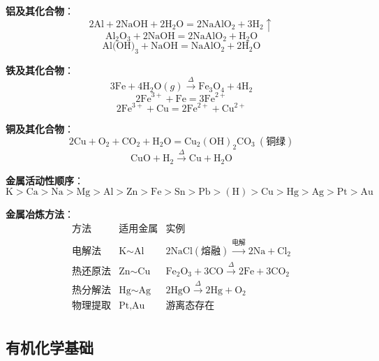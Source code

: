 \textbf{铝及其化合物}：
\[
2\text{Al} + 2\text{NaOH} + 2\text{H}_2\text{O} = 2\text{NaAlO}_2 + 3\text{H}_2\uparrow
\]
\[
\text{Al}_2\text{O}_3 + 2\text{NaOH} = 2\text{NaAlO}_2 + \text{H}_2\text{O}
\]
\[
\text{Al(OH)}_3 + \text{NaOH} = \text{NaAlO}_2 + 2\text{H}_2\text{O}
\]

\textbf{铁及其化合物}：
\[
3\text{Fe} + 4\text{H}_2\text{O}(g) \xrightarrow{\Delta} \text{Fe}_3\text{O}_4 + 4\text{H}_2
\]
\[
2\text{Fe}^{3+} + \text{Fe} = 3\text{Fe}^{2+}
\]
\[
2\text{Fe}^{3+} + \text{Cu} = 2\text{Fe}^{2+} + \text{Cu}^{2+}
\]

\textbf{铜及其化合物}：
\[
2\text{Cu} + \text{O}_2 + \text{CO}_2 + \text{H}_2\text{O} = \text{Cu}_2(\text{OH})_2\text{CO}_3\ (\text{铜绿})
\]
\[
\text{CuO} + \text{H}_2 \xrightarrow{\Delta} \text{Cu} + \text{H}_2\text{O}
\]

\textbf{金属活动性顺序}：
\[
\text{K} > \text{Ca} > \text{Na} > \text{Mg} > \text{Al} > \text{Zn} > \text{Fe} > \text{Sn} > \text{Pb} > (\text{H}) > \text{Cu} > \text{Hg} > \text{Ag} > \text{Pt} > \text{Au}
\]

\textbf{金属冶炼方法}：
\[
\begin{array}{c|c|c}
\text{方法} & \text{适用金属} & \text{实例} \\ \hline
\text{电解法} & \text{K}\sim\text{Al} & 2\text{NaCl}(\text{熔融}) \xrightarrow{\text{电解}} 2\text{Na} + \text{Cl}_2 \\
\text{热还原法} & \text{Zn}\sim\text{Cu} & \text{Fe}_2\text{O}_3 + 3\text{CO} \xrightarrow{\Delta} 2\text{Fe} + 3\text{CO}_2 \\
\text{热分解法} & \text{Hg}\sim\text{Ag} & 2\text{HgO} \xrightarrow{\Delta} 2\text{Hg} + \text{O}_2 \\
\text{物理提取} & \text{Pt},\text{Au} & \text{游离态存在} \\
\end{array}
\]

\subsection{有机化学基础}


